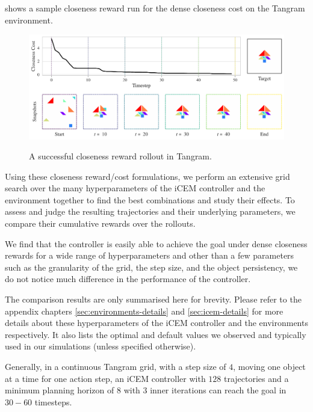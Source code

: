  shows a sample closeness reward run for the dense closeness cost on the Tangram environment.

\begin{figure}[h]
    \centering
    \href{https://drive.google.com/file/d/15IAo_xsNFSUI0YFVjrIBfn7LAV2hO68E}{\includegraphics[width=\textwidth]{images/closeness_trajectory_495.pdf}}
    \caption[A successful closeness reward rollout in Tangram.]{A successful closeness reward rollout in Tangram\footnotemark[1].}
    \label{fig:closeness-rollouts}
\end{figure}

Using these closeness reward/cost formulations, we perform an extensive grid search over the many hyperparameters of the iCEM controller and the environment together to find the best combinations and study their effects.
To assess and judge the resulting trajectories and their underlying parameters, we compare their cumulative rewards over the rollouts.

We find that the controller is easily able to achieve the goal under dense closeness rewards for a wide range of hyperparameters and other than a few parameters such as the granularity of the grid, the step size, and the object persistency, we do not notice much difference in the performance of the controller.

The comparison results are only summarised here for brevity. Please refer to the appendix chapters \ref{sec:environments-details} and \ref{sec:icem-details} for more details about these hyperparameters of the iCEM controller and the environments respectively. It also lists the optimal and default values we observed and typically used in our simulations (unless specified otherwise).

Generally, in a continuous Tangram grid, with a step size of \(4\), moving one object at a time for one action step, an iCEM controller with \(128\) trajectories and a minimum planning horizon of \(8\) with \(3\) inner iterations can reach the goal in \(30-60\) timesteps.


